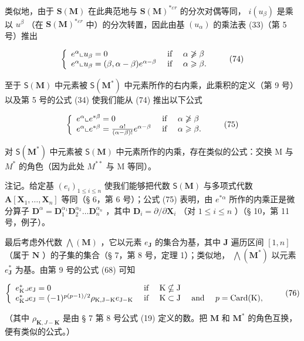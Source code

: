 类似地，由于 \(\mathbf{S}(\mathbf{M})\) 在此典范地与 \(\mathbf{S}(\mathbf{M})^{*\varepsilon r}\) 的分次对偶等同， \(i(u_{\beta})\) 是乘以 \(u^{\beta}\) （在 \(\mathbf{S}(\mathbf{M})^{*\varepsilon r}\) 中）的分次转置，因此由基 \((u_{\alpha})\) 的乘法表 (33)（第 5 号）推出

\[
\left\{ \begin{array}{l l} e ^ {\alpha} \llcorner u _ {\beta} = 0 & \text { if } \quad \alpha \not \geqslant \beta \\ e ^ {\alpha} \llcorner u _ {\beta} = (\beta , \alpha - \beta) e ^ {\alpha - \beta} & \text { if } \quad \alpha \geqslant \beta . \end{array} \right.\tag{74}
\]

至于 \(\mathsf{S}(\mathbf{M})\) 中元素被 \(\mathsf{S}(\mathbf{M}^*)\) 中元素所作的右内乘，此乘积的定义（第 9 号）以及第 5 号的公式 (34) 使我们能从 (74) 推出以下公式

\[
\left\{ \begin{array}{l l} e ^ {\alpha} \llcorner e ^ {* \beta} = 0 & \text { if } \quad \alpha \not \geqslant \beta \\ e ^ {\alpha} \llcorner e ^ {* \beta} = \frac {\alpha !}{(\alpha - \beta) !} e ^ {\alpha - \beta} & \text { if } \quad \alpha \geqslant \beta . \end{array} \right.\tag{75}
\]

对 \(\mathsf{S}(\mathbf{M}^{*})\) 中元素被 \(\mathsf{S}(\mathbf{M})\) 中元素所作的内乘，存在类似的公式：交换 M 与 \(M^{*}\) 的角色（因为此处 \(M^{**}\) 与 M 等同）。

注记。给定基 \((e_i)_{1\leq i\leq n}\) 使我们能够把代数 \(\mathsf{S}(\mathbf{M})\) 与多项式代数 \(\mathbf{A}[\mathbf{X}_1,\ldots ,\mathbf{X}_n]\) 等同（§ 6，第 6 号）；公式 (75) 表明，由 \(e^{*\alpha}\) 所作的内乘正是微分算子 \(\mathbf{D}^{\alpha} = \mathbf{D}_{1}^{\alpha_{1}}\mathbf{D}_{2}^{\alpha_{2}}\ldots \mathbf{D}_{n}^{\alpha_{n}}\) ，其中 \(\mathbf{D}_i = \partial /\partial \mathbf{X}_i\) （对 \(1\leqslant i\leqslant n\) ）（§ 10，第 11 号，例子）。

最后考虑外代数 \(\bigwedge (\mathbf{M})\) ，它以元素 \(e_{\mathbf{J}}\) 的集合为基，其中 \(\mathbf{J}\) 遍历区间 \([1, n]\) （属于 \(\mathbf{N}\) ）的子集的集合（§ 7，第 8 号，定理 1）；类似地， \(\bigwedge (\mathbf{M}^*)\) 以元素 \(e_{\mathbf{J}}^{*}\) 为基。由第 9 号的公式 (68) 可知

\[
\left\{ \begin{array}{l l} e _ {\mathrm{K}} ^ {*} \lrcorner e _ {\mathrm{J}} = 0 & \text { if } \quad \mathrm{K} \nsubseteq \mathrm{J} \\ e _ {\mathrm{K}} ^ {*} \lrcorner e _ {\mathrm{J}} = (- 1) ^ {p (p - 1) / 2} \rho_ {\mathrm{K}, \mathrm{J} - \mathrm{K}} e _ {\mathrm{J} - \mathrm{K}} & \text { if } \quad \mathrm{K} \subset \mathrm{J} \quad \text { and } \quad p = \operatorname{Card} (\mathrm{K}), \end{array} \right.\tag{76}
\]

（其中 \(\rho_{\mathbf{K},J - \mathbf{K}}\) 是由 § 7 第 8 号公式 (19) 定义的数。把 \(\mathbf{M}\) 和 \(\mathbf{M}^*\) 的角色互换，便有类似的公式。）

